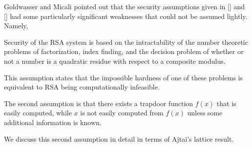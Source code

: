 Goldwasser and Micali pointed out that the security assumptions given in [\cite{rab19790}] and  [\cite{rab19790}] had some particularly significant weaknesses that could not be assumed lightly. Namely,

\begin{asu} 
Security of the RSA system is based on the intractability of the number theoretic problems of factorization, index finding, and the decision problem of whether or not a number is a quadratic residue with respect to a composite modulus. 
\end{asu}
\medskip 
This assumption states that the impossible hardness of one of these problems is equivalent to RSA being computationally infeasible. 
\medskip

\begin{asu}
The second assumption is that there exists a trapdoor function $f(x)$ that is easily computed, while $x$ is not easily computed from $f(x)$ unless some additional information is known. 
\end{asu}

We discuss this second assumption in detail in terms of Ajtai's lattice result.
\bigskip